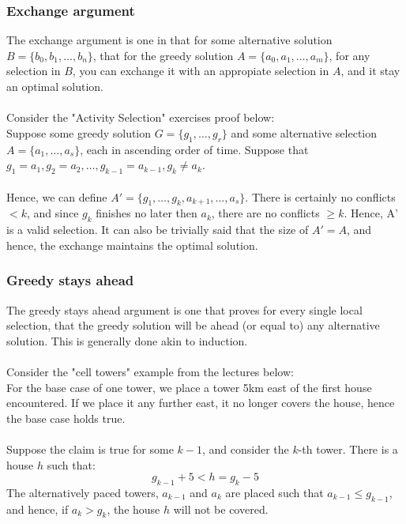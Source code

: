 \documentclass[journal, letterpaper]{IEEEtran}
\begin{document}
  \subsubsection{Exchange argument}
  The exchange argument is one in that for some alternative solution $B = \{b_0, b_1, \ldots, b_n\}$, that for the
  greedy solution $A = \{a_0, a_1, \ldots, a_m\}$, for any selection in $B$, you can exchange it with an appropiate
  selection in $A$, and it stay an optimal solution. \\ \\ 
  Consider the "Activity Selection" exercises proof below: \\ 
  Suppose some greedy solution $G = \{g_1, \ldots, g_r\}$ and some alternative selection $A = \{a_1, \ldots, a_s\}$, each in
  ascending order of time. Suppose that $g_1 = a_1, g_2 = a_2, \ldots, g_{k-1} = a_{k-1}, g_k \neq a_k$. \\ \\ 
  Hence, we can define $A' = \{ g_1, \ldots, g_k, a_{k + 1}, \ldots, a_s\}$. There is certainly no conflicts $< k$, and since
  $g_k$ finishes no later then $a_k$, there are no conflicts $\ge k$. Hence, A' is a valid selection. It can also be trivially
  said that the size of $A' = A$, and hence, the exchange maintains the optimal solution. \\
  \subsubsection{Greedy stays ahead}
  The greedy stays ahead argument is one that proves for every single local selection, that the greedy solution
  will be ahead (or equal to) any alternative solution. This is generally done akin to induction. \\ \\  Consider the "cell towers"
  example from the lectures below: \\ 
  For the base case of one tower, we place a tower 5km east of the first house encountered. If we place it any further east,
  it no longer covers the house, hence the base case holds true. \\ \\ 
  Suppose the claim is true for some $k - 1$, and consider the $k$-th tower. There is a house $h$ such that:
  \[g_{k-1} + 5 < h = g_k - 5\]
  The alternatively paced towers, $a_{k -1}$ and $a_{k}$ are placed such that $a_{k-1} \le g_{k-1}$, and hence, if $a_k > g_k$, the
  house $h$ will not be covered.
\end{document}
